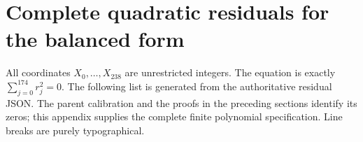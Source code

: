 \documentclass[11pt]{article}
\theoremstyle{remark}\newtheorem{remark}[theorem]{Remark}
\begin{document}
\appendix
\section{Complete quadratic residuals for the balanced form}\label{app:residuals}

All coordinates $X_0,\ldots,X_{238}$ are unrestricted integers.
The equation is exactly $\sum_{j=0}^{174}r_j^2=0$.
The following list is generated from the authoritative residual JSON.
The parent calibration and the proofs in the preceding sections
identify its zeros; this appendix supplies the complete finite
polynomial specification. Line breaks are purely typographical.

\end{document}
